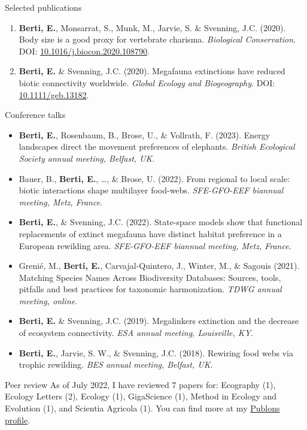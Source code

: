 \documentclass{resume} %
\begin{document}
\begin{rSection}{Selected publications}
\begin{enumerate}
    \item \textbf{Berti, E.}, Monsarrat, S., Munk, M., Jarvie, S. \& Svenning, J.C. (2020). Body size is a good proxy for vertebrate charisma. \textit{Biological Conservation}. DOI: \href{https://doi.org/10.1016/j.biocon.2020.108790}{10.1016/j.biocon.2020.108790}.
    \item \textbf{Berti, E.} \& Svenning, J.C. (2020). Megafauna extinctions have reduced biotic connectivity worldwide. \textit{Global Ecology and Biogeography}. DOI: \href{https://doi.org/10.1111/geb.13182}{10.1111/geb.13182}.
\end{enumerate}
\end{rSection}

\begin{rSection}{Conference talks}
\begin{itemize}
    \setlength\itemsep{-0.5em}
    \item[Submitted] \textbf{Berti, E.}, Rosenbaum, B., Brose, U., \& Vollrath, F. (2023). Energy landscapes direct the movement preferences of elephants. \textit{British Ecological Society annual meeting, Belfast, UK}.
    \item[Invited] Bauer, B., \textbf{Berti, E.}, \dots, \& Brose, U. (2022). From regional to local scale: biotic interactions shape multilayer food-webs. \textit{SFE-GFO-EEF biannual meeting, Metz, France}.
    \item[Submitted] \textbf{Berti, E.}, \& Svenning, J.C. (2022). State-space models show that functional replacements of extinct megafauna have distinct habitat preference in a European rewilding area. \textit{SFE-GFO-EEF biannual meeting, Metz, France}.
    \item[Submitted] Grenié, M., \textbf{Berti, E.}, Carvajal-Quintero, J., Winter, M., \& Sagouis (2021). Matching Species Names Across Biodiversity Databases: Sources, tools, pitfalls and best practices for taxonomic harmonization. \textit{TDWG annual meeting, online}.
    \item[Submitted] \textbf{Berti, E.} \& Svenning, J.C. (2019). Megalinkers extinction and the decrease of ecosystem connectivity. \textit{ESA annual meeting, Louisville, KY}.
    \item[Submitted] \textbf{Berti, E.}, Jarvie, S. W., \& Svenning, J.C. (2018). Rewiring food webs via trophic rewilding. \textit{BES annual meeting, Belfast, UK}.
\end{itemize}
\end{rSection}

\begin{rSection}{Peer review}
As of July 2022, I have reviewed 7 papers for: Ecography (1), Ecology Letters (2), Ecology (1), GigaScience (1), Method in Ecology and Evolution (1), and Scientia Agricola (1). You can find more at my \href{https://publons.com/wos-op/researcher/4208953/emilio-berti/}{Publons profile}.
\end{rSection}
\end{document}
